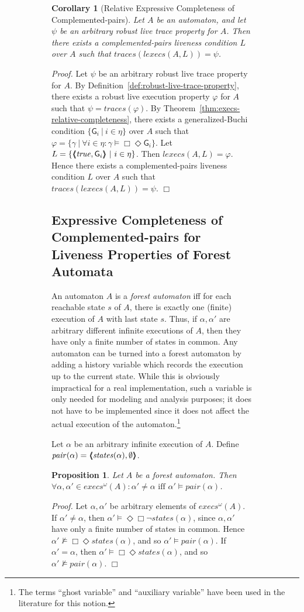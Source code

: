 \documentclass[11pt]{article}
\newcommand{\bp}{\begin{proposition}}
\newcommand{\ep}{\end{proposition}}
\newcommand{\bco}{\begin{corollary}}
\newcommand{\eco}{\end{corollary}}
\newcommand{\bpr}{\begin{proof}}
\newcommand{\epr}{\end{proof}}
\newcommand{\intrdef}{\emph}	\newcommand{\intr}{\emph}
\newcommand{\fa}{\forall}
\newcommand{\sat}{\models}
\newcommand{\G}{\mathsf{G}}
\newcommand{\pair}[2]{\lpb #1, #2 \rpb}
\newcommand{\lpb}{\langle \hspace{-0.34em} \langle \hspace{-0.34em} \langle}
\newcommand{\rpb}{\rangle \hspace{-0.34em} \rangle \hspace{-0.34em} \rangle}
\newcommand{\al}{\alpha}
\newcommand{\execs}{\mathit{lexecs}}
\newcommand{\iexecs}{\mathit{execs}^\omega}
\newcommand{\ga}{\gamma}
\newcommand{\pr}{\mathit{pair}}
\newcommand{\states}{\mathit{states}}
\newcommand{\traces}{\mathit{traces}}
\newcommand{\ea}{\Diamond \Box}
\newcommand{\iof}{\Box \Diamond}
\newtheorem{proposition}[theorem]{Proposition}
\newtheorem{corollary}[theorem]{Corollary}
\newenvironment{proof}{\vspace{-1.0ex}\textit{Proof.} }
                      {\hfill{$\Box$}}
\begin{document}
\begin{figure}[htb]
\begin{figure}[htb]
\bco[Relative Expressive Completeness of Complemented-pairs]
\label{thm:traces-relative-completeness}
Let $A$ be an automaton, and let $\psi$ be an arbitrary
robust live trace property for $A$. Then there exists a 
complemented-pairs liveness condition
$L$ over $A$ such that $\traces(\execs(A,L)) = \psi$.
\eco
\bpr
Let $\psi$ be an arbitrary robust live trace property for $A$.
By Definition~\ref{def:robust-live-trace-property}, 
there exists a robust live execution property $\varphi$ for $A$ such that 
$\psi = \traces(\varphi)$.
By Theorem~\ref{thm:execs-relative-completeness}, there exists a 
generalized-Buchi condition $\{ \G_i ~|~ i \in \eta \}$ over $A$
such that 
$\varphi = \{ \ga ~|~ \fa {i \in \eta} : \ga \sat \iof \G_i \}$.
Let $L = \{ \pair{\true}{\G_i} ~|~ i \in \eta \}$. Then 
$\execs(A,L) = \varphi$.
Hence there exists a complemented-pairs liveness condition
$L$ over $A$ such that $\traces(\execs(A,L)) = \psi$.
\epr





\subsection{Expressive Completeness of Complemented-pairs for Liveness Properties of 
            Forest Automata}
\label{sec:forest}

An automaton $A$ is a \intrdef{forest automaton} iff for each reachable state
$s$ of $A$, there is exactly one (finite) execution of $A$ with last
state $s$. 
Thus, if $\al, \al'$ are arbitrary different infinite executions of $A$, then
they have only a finite number of states in common.
Any automaton can be turned into a forest automaton by
adding a history variable which records the execution up to the current
state. While this is obviously impractical for a real implementation,
such a variable is only needed for modeling and analysis purposes; it
does not have to be implemented since it does not affect the actual 
execution of the automaton.\footnote{The terms ``ghost variable'' and
``auxiliary variable'' have been used in the literature for this notion.}

Let $\al$ be an arbitrary infinite execution of $A$.
Define $\pr(\al) = \pair{\states(\al)}{\emptyset}$.


\bp
\label{prop:exec-pair}
Let $A$ be a forest automaton. Then
$\fa \al, \al' \in \iexecs(A): \al' \ne \al \mbox{~iff~} \al' \sat \pr(\al)$.
\ep
\bpr
Let $\al, \al'$ be arbitrary elements of $\iexecs(A)$.
If $\al' \ne \al$, then $\al' \sat \ea \neg \states(\al)$,
since $\al, \al'$ have only a finite number of states in common.
Hence $\al' \not\sat \iof \states(\al)$, and so $\al' \sat \pr(\al)$.
If $\al' = \al$, then $\al' \sat \iof \states(\al)$, and so 
      $\al' \not\sat \pr(\al)$.
\epr



\end{figure}
\end{figure}
\end{document}
